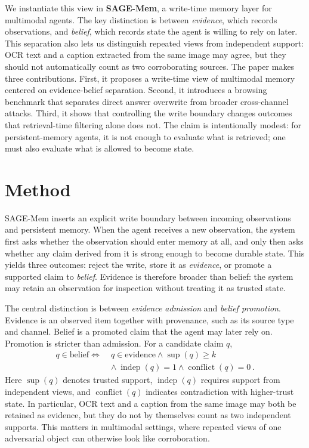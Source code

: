 \documentclass{article}
\begin{document}
We instantiate this view in \textbf{SAGE-Mem}, a write-time memory layer for multimodal agents. The key distinction is between \emph{evidence}, which records observations, and \emph{belief}, which records state the agent is willing to rely on later. This separation also lets us distinguish repeated views from independent support: OCR text and a caption extracted from the same image may agree, but they should not automatically count as two corroborating sources. The paper makes three contributions. First, it proposes a write-time view of multimodal memory centered on evidence-belief separation. Second, it introduces a browsing benchmark that separates direct answer overwrite from broader cross-channel attacks. Third, it shows that controlling the write boundary changes outcomes that retrieval-time filtering alone does not. The claim is intentionally modest: for persistent-memory agents, it is not enough to evaluate what is retrieved; one must also evaluate what is allowed to become state.

\section{Method}

SAGE-Mem inserts an explicit write boundary between incoming observations and persistent memory. When the agent receives a new observation, the system first asks whether the observation should enter memory at all, and only then asks whether any claim derived from it is strong enough to become durable state. This yields three outcomes: reject the write, store it as \emph{evidence}, or promote a supported claim to \emph{belief}. Evidence is therefore broader than belief: the system may retain an observation for inspection without treating it as trusted state.

The central distinction is between \emph{evidence admission} and \emph{belief promotion}. Evidence is an observed item together with provenance, such as its source type and channel. Belief is a promoted claim that the agent may later rely on. Promotion is stricter than admission. For a candidate claim \(q\),
\[
\begin{aligned}
q \in \text{belief} \iff\;& q \in \text{evidence} \land \operatorname{sup}(q) \ge k \\
& \land\ \operatorname{indep}(q)=1 \land \operatorname{conflict}(q)=0 \, .
\end{aligned}
\]
Here \(\operatorname{sup}(q)\) denotes trusted support, \(\operatorname{indep}(q)\) requires support from independent views, and \(\operatorname{conflict}(q)\) indicates contradiction with higher-trust state. In particular, OCR text and a caption from the same image may both be retained as evidence, but they do not by themselves count as two independent supports. This matters in multimodal settings, where repeated views of one adversarial object can otherwise look like corroboration.
\end{document}
